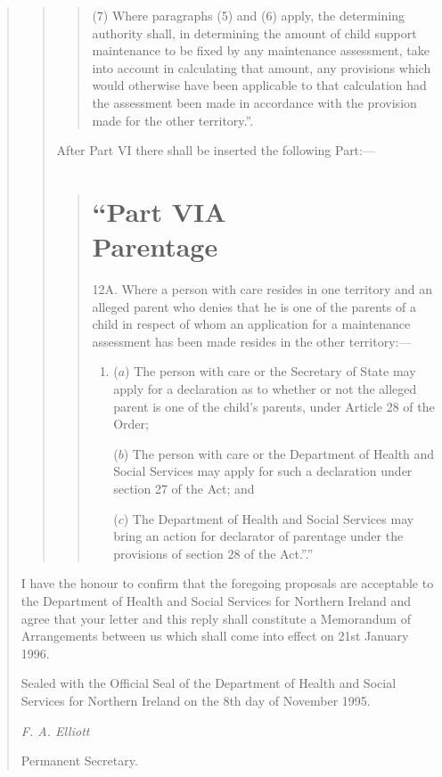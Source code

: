 \documentclass[a4paper]{article}
\begin{document}
\begin{quotation}
\begin{quotation}
\begin{quotation}
\begin{sloppypar}
(7) Where paragraphs (5) and (6) apply, the determining authority shall, in determining the amount of child support maintenance to be fixed by any maintenance assessment, take into account in calculating that amount, any provisions which would otherwise have been applicable to that calculation had the assessment been made in accordance with the provision made for the other territory.”.
\end{sloppypar}
\end{quotation}

  After Part VI there shall be inserted the following Part:—
\begin{quotation}
 \part*{“Part VIA\\Parentage}

12A.  Where a person with care resides in one territory and an alleged parent who denies that he is one of the parents of a child in respect of whom an application for a maintenance assessment has been made resides in the other territory:—
\begin{enumerate}\item[]
\begin{sloppypar}
($a$) The person with care or the Secretary of State may apply for a declaration as to whether or not the alleged parent is one of the child’s parents, under Article 28 of the Order;
\end{sloppypar}

($b$) The person with care or the Department of Health and Social Services may apply for such a declaration under section 27 of the Act; and

($c$) The Department of Health and Social Services may bring an action for declarator of parentage under the provisions of section 28 of the Act.”.”
\end{enumerate}
\end{quotation}
\end{quotation}

  I have the honour to confirm that the foregoing proposals are acceptable to the Department of Health and Social Services for Northern Ireland and agree that your letter and this reply shall constitute a Memorandum of Arrangements between us which shall come into effect on 21st January 1996.

  Sealed with the Official Seal of the Department of Health and Social Services for Northern Ireland on the 8th day of November 1995.

  \emph{F. A. Elliott}

  Permanent Secretary.
\end{quotation}
\end{document}
